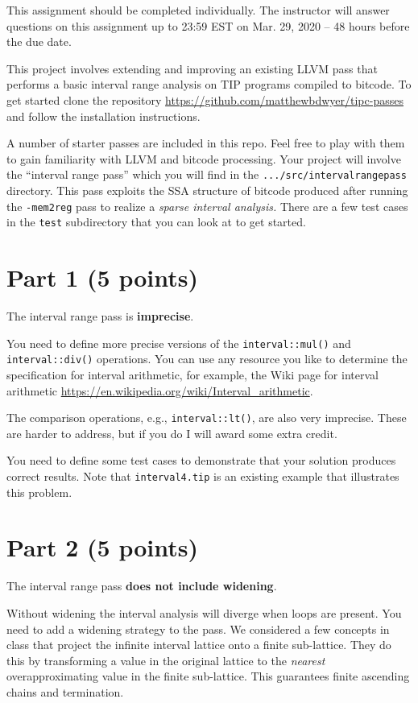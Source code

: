 \documentclass[12pt,letterpaper]{article}
\begin{document}
This assignment should be completed individually.
The instructor will answer questions on this assignment up to 23:59 EST on Mar. 29, 2020 -- 48 hours before the due date. 

This project involves extending and improving an existing LLVM pass that performs a basic interval range analysis on TIP programs compiled to bitcode.  To get started clone the repository \url{https://github.com/matthewbdwyer/tipc-passes} and follow the installation instructions. 

A number of starter passes are included in this repo.  Feel free to play with them to gain familiarity with LLVM and bitcode processing.  Your project will involve the ``interval range pass'' which you will find in the \texttt{.../src/intervalrangepass} directory.  This pass exploits the SSA structure of bitcode produced after running the \texttt{-mem2reg} pass to realize a \textit{sparse interval analysis.}  There are a few test cases in the \texttt{test} subdirectory that you can look at to get started.

\section*{Part 1 (5 points)}
The interval range pass is \textbf{imprecise}.  

You need to define more precise versions of the \texttt{interval::mul()} and \texttt{interval::div()} operations.  You can use any resource you like to determine the specification for interval arithmetic, for example, the Wiki page for interval arithmetic \url{https://en.wikipedia.org/wiki/Interval_arithmetic}.  

The comparison operations, e.g., \texttt{interval::lt()}, are also very imprecise.  These are harder to address, but if you do I will award some extra credit.

You need to define some test cases to demonstrate that your solution produces correct results.  Note that \texttt{interval4.tip} is an existing example that illustrates this problem.

\section*{Part 2 (5 points)}
The interval range pass \textbf{does not include widening}.

Without widening the interval analysis will diverge when loops are present.
You need to add a widening strategy to the pass.
We considered a few concepts in class that project the infinite interval lattice onto a finite sub-lattice.  They do this by transforming a value in the original lattice to the \textit{nearest} overapproximating value in the finite sub-lattice.  This guarantees finite ascending chains and termination.
\end{document}
